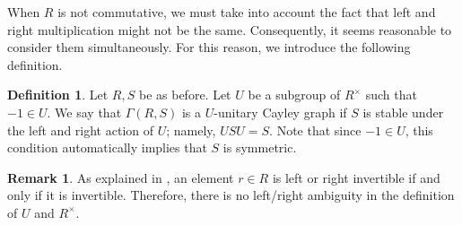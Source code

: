 \documentclass[12pt, a4paper]{amsart}
\theoremstyle{definition}
\newtheorem{definition}[thm]{Definition}
\newtheorem{rem}[thm]{Remark}
\numberwithin{equation}{section}
\begin{document}
When $R$ is not commutative, we must take into account the fact that left and right multiplication might not be the same. Consequently, it seems reasonable to consider them simultaneously. For this reason, we introduce the following definition.

\begin{definition}
 Let $R, S$ be as before. Let $U$ be a subgroup of $R^{\times}$ such that $-1 \in U$.
 We say that $\Gamma(R,S)$ is a $U$-unitary Cayley graph if $S$ is stable under the left and right action of $U$; namely, $USU = S$. Note that since $-1 \in U$, this condition automatically implies that $S$ is symmetric.
\end{definition}



\begin{rem}
    As explained in \cite[Proposition 2.1]{minavc2024complete}, an element $r \in R$ is left or right invertible if and only if it is invertible. Therefore, there is no left/right ambiguity in the definition of $U$ and $R^{\times}.$
\end{rem}
\end{document}
